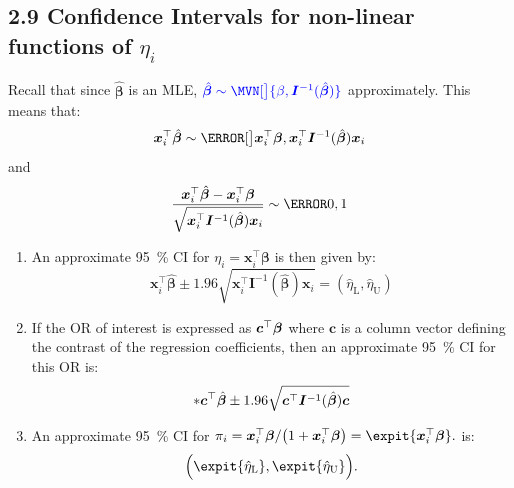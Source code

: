 \documentclass[oneside]{book}\usepackage[]{graphicx}\usepackage[svgnames]{xcolor}
\let\exp\relax%
\providecommand{\Vector}[1]{\bm{#1}}%
\providecommand{\Matrix}[1]{\bm{#1}}
\begin{document}
\subsection*{2.9 Confidence Intervals for non-linear functions of $ \eta_i $}
Recall that since $ \hat{\Vector{\beta}} $ is an MLE, $ \textcolor{Blue}{\hat{\Vector{\beta}} \sim \MVN[\big]{\beta,\Matrix{I}^{-1}(\hat{\Vector{\beta}})}} $ approximately. This means that:
\[ \Vector{x}_i^\top \hat{\Vector{\beta}}\sim \N[\big]{\Vector{x}_i^\top \Vector{\beta},\Vector{x}_i^\top \Matrix{I}^{-1}(\hat{\Vector{\beta}})\Vector{x}_i} \]
and
\[ \frac{\Vector{x}_i^\top \hat{\Vector{\beta}}-\Vector{x}_i^\top \Vector{\beta}}{\sqrt{\Vector{x}_i^\top \Matrix{I}^{-1}(\hat{\Vector{\beta}})\Vector{x}_i}} \sim \N{0,1}  \]
\begin{Regular}{}
      \begin{enumerate}[1.]
            \item An approximate \qty{95}{\percent} CI for $ \eta_i=\Vector{x}_i^\top \Vector{\beta} $ is then given by:
                  \[ \Vector{x}_i^\top \hat{\Vector{\beta}}\pm 1.96\sqrt{\Vector{x}_i^\top \Matrix{I}^{-1}(\hat{\Vector{\beta}})\Vector{x}_i}=(\hat{\eta}_\text{L},\hat{\eta}_\text{U}) \]
            \item If the OR of interest is expressed as $ \exp{\Vector{c}^\top \Vector{\beta}} $ where $ \Vector{c} $ is a column vector defining
                  the contrast of the regression coefficients, then an approximate \qty{95}{\percent} CI for this OR is:
                  \[ \exp*{\Vector{c}^\top\hat{\Vector{\beta}}\pm 1.96\sqrt{\Vector{c}^\top\Matrix{I}^{-1}(\hat{\Vector{\beta}})\Vector{c}}} \]
            \item An approximate \qty{95}{\percent} CI for $ \pi_i=\exp{\Vector{x}_i^\top \Vector{\beta}}/\bigl(1+\exp{\Vector{x}_i^\top \Vector{\beta}}\bigr)=\expit{\Vector{x}_i^\top \Vector{\beta}}. $ is:
                  \[ \Bigl(\expit{\hat{\eta}_\text{L}},\expit{\hat{\eta}_\text{U}}\Bigr). \]
      \end{enumerate}
\end{Regular}
\end{document}
